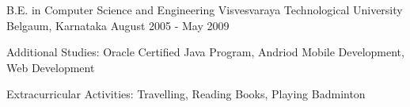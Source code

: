 \begin{cventries}
  \cventry
    {B.E. in Computer Science and Engineering}
    {Visvesvaraya Technological University}
    {Belgaum, Karnataka}
    {August 2005 - May 2009}
    {
      \begin{cvitems}
        \item {Additional Studies: Oracle Certified Java Program, Andriod Mobile Development, Web Development}
        \item {Extracurricular Activities: Travelling, Reading Books, Playing Badminton}
      \end{cvitems}
    }
\end{cventries}
